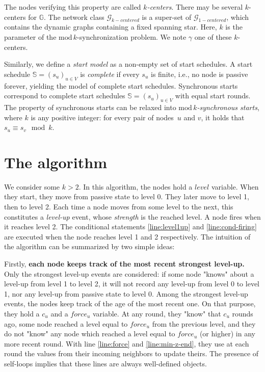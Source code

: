 \documentclass[11pt,letterpaper]{article}
\newcommand{\cent}{\gamma}
\begin{document}
The nodes verifying this property are called \textit{$k$-centers}.
There may be several $k$-centers for $\mathds{G}$.
The network class $\mathcal{G}_{k-centered}$ is a super-set of $\mathcal{G}_{1-centered}$, which contains the dynamic graphs containing a fixed spanning star.
Here, $k$ is the parameter of the $\mathrm{mod}\,k$-synchronization problem.
We note $\cent$ one of these $k$-centers.

Similarly, we define a \emph{start model} as a non-empty set of start schedules.
A start schedule $\mathds{S} = (s_u)_{u\in V}$ is \emph{complete} if every $s_u$ is finite, i.e.,
no node is passive forever, yielding the model of complete start schedules.
Synchronous starts correspond to complete start schedules $\mathds{S} = (s_u)_{u\in V}$ with
equal start rounds.	
The property of synchronous starts can be relaxed into \emph{$\mathrm{mod}\,k$-synchronous starts},
where $k$ is any positive integer: for every pair of nodes~$u$ and $v$, it holds that $s_u \equiv s_v \!\mod k$.

\section{The algorithm}

We consider some $k > 2$.
In this algorithm, the nodes hold a $level$ variable. When they start, they move from passive state to level 0. They later move to level 1, then to level 2.
Each time a node moves from some level to the next, this constitutes a \textit{level-up} event, whose \textit{strength} is the reached level.
A node fires when it reaches level 2.
The conditional statements \ref{line:level1up} and \ref{line:cond-firing} are executed when the node reaches level 1 and 2 respectively.
The intuition of the algorithm can be summarized by two simple ideas:

Firstly, \textbf{each node keeps track of the most recent strongest level-up.}
Only the strongest level-up events are considered: if some node "knows" about a level-up from level 1 to level 2,
it will not record any level-up from level 0 to level 1, nor any level-up from passive state to level 0.
Among the strongest level-up events, the nodes keep track of the age of the most recent one.
On that purpose, they hold a $c_u$ and a $force_u$ variable.
At any round, they "know" that $c_u$ rounds ago, some node reached a level equal to $force_u$ from the previous level,
and they do not "know" any node which reached a level equal to $force_u$ (or higher) in any more recent round.
With line \ref{line:force} and \ref{line:min-z-end}, they use at each round the values from their incoming neighbors to update theirs.
The presence of self-loops implies that these lines are always well-defined objects.
\end{document}
